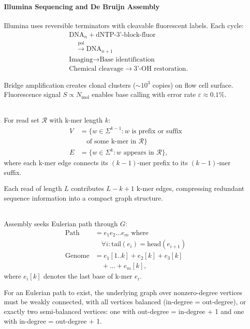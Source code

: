 \begin{technical}
{\Large\textbf{Illumina Sequencing and De Bruijn Assembly}}\\[0.3em]

\\[0.5em]
Illumina uses reversible terminators with cleavable fluorescent labels. Each cycle:
\begin{align*}
&\text{DNA}_n + \text{dNTP-3'-block-fluor}\\
&\quad\xrightarrow{\text{pol}} \text{DNA}_{n+1}\\
&\text{Imaging} \rightarrow \text{Base identification}\\
&\text{Chemical cleavage} \rightarrow \text{3'-OH restoration}.
\end{align*}

Bridge amplification creates clonal clusters ($\sim10^3$ copies) on flow cell surface. Fluorescence signal $S \propto N_{\text{mol}}$ enables base calling with error rate $\varepsilon \approx 0.1\%$.

\\[0.5em]
For read set $\mathcal{R}$ with k-mer length $k$:
\begin{align*}
V &= \{w \in \Sigma^{k-1} : w \text{ is prefix or suffix}\\
&\quad\text{of some k-mer in } \mathcal{R}\}\\
E &= \{w \in \Sigma^k : w \text{ appears in } \mathcal{R}\},
\end{align*}
where each k-mer edge connects its $(k-1)$-mer prefix to its $(k-1)$-mer suffix.

Each read of length $L$ contributes $L-k+1$ k-mer edges, compressing redundant sequence information into a compact graph structure.

\\[0.5em]
Assembly seeks Eulerian path through $G$:
\begin{align*}
\text{Path} &= e_1e_2...e_m \text{ where}\\
&\quad \forall i: \text{tail}(e_i) = \text{head}(e_{i+1})\\
\text{Genome} &= e_1[1..k] + e_2[k] + e_3[k]\\
&\quad + ... + e_m[k],
\end{align*}
where $e_i[k]$ denotes the last base of k-mer $e_i$.

For an Eulerian path to exist, the underlying graph over nonzero-degree vertices must be weakly connected, with all vertices balanced (in-degree = out-degree), or exactly two semi-balanced vertices: one with out-degree = in-degree + 1 and one with in-degree = out-degree + 1.


\end{technical}
